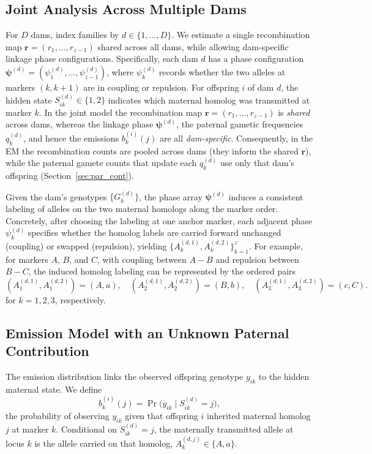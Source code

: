 \documentclass[11pt]{article}
\begin{document}
\subsection{Joint Analysis Across Multiple Dams}
For $D$ dams, index families by $d\in\{1,\ldots,D\}$. We estimate a single recombination map
$\mathbf r=(r_1,\ldots,r_{z-1})$ shared across all dams, while allowing dam-specific linkage
phase configurations. Specifically, each dam $d$ has a phase configuration
$\boldsymbol{\psi}^{(d)}=(\psi_1^{(d)},\ldots,\psi_{z-1}^{(d)})$, where $\psi_k^{(d)}$
records whether the two alleles at markers $(k,k{+}1)$ are in coupling or repulsion.
For offspring $i$ of dam $d$, the hidden state $S_{ik}^{(d)}\in\{1,2\}$ indicates which
maternal homolog was transmitted at marker $k$. In the joint model the recombination map
$\mathbf r=(r_1,\ldots,r_{z-1})$ is \emph{shared} across dams, whereas the linkage phase
$\boldsymbol{\psi}^{(d)}$, the paternal gametic frequencies $q_k^{(d)}$, and hence the emissions
$b_k^{(i)}(j)$ are all \emph{dam-specific}. Consequently, in the EM the recombination counts are
pooled across dams (they inform the shared $\mathbf r$), while the paternal gamete counts that
update each $q_k^{(d)}$ use only that dam's offspring (Section~\ref{sec:par_cont}).

Given the dam's genotypes $\{G_k^{(d)}\}$, the phase array $\boldsymbol{\psi}^{(d)}$
induces a consistent labeling of alleles on the two maternal homologs along the marker order.
Concretely, after choosing the labeling at one anchor marker, each adjacent phase
$\psi_k^{(d)}$ specifies whether the homolog labels are carried forward unchanged
(coupling) or swapped (repulsion), yielding $\{A_k^{(d,1)},A_k^{(d,2)}\}_{k=1}^z$. For example, for markers $A$, $B$, and $C$, with coupling between $A-B$
and repulsion between $B-C$, the induced homolog labeling can be
represented by the ordered pairs
\[
(A_1^{(d,1)},A_1^{(d,2)})=(A,a),\quad
(A_2^{(d,1)},A_2^{(d,2)})=(B,b),\quad
(A_3^{(d,1)},A_3^{(d,2)})=(c,C).
\]
for $k=1,2,3$, respectively.

\subsection{Emission Model with an Unknown Paternal Contribution}
\label{emission}
The emission distribution links the observed offspring genotype $y_{ik}$ to the hidden maternal
state. We define
\[
b_k^{(i)}(j)=\Pr\!\big(y_{ik}\mid S_{ik}^{(d)}=j\big),
\]
the probability of observing $y_{ik}$ given that offspring $i$ inherited maternal homolog $j$
at marker $k$. Conditional on $S_{ik}^{(d)}=j$, the maternally transmitted allele at locus $k$
is the allele carried on that homolog, $A_k^{(d,j)}\in\{A,a\}$.
\end{document}
